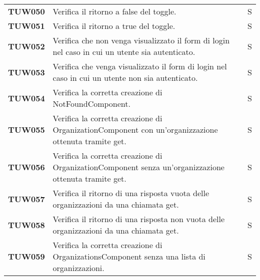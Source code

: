\documentclass[../../piano-di-qualifica.tex]{subfiles}
\begin{document}
\begin{longtable}[H]{>{\centering\bfseries}m{3cm} >{}m{10cm} >{\centering\arraybackslash}m{3cm}}
  TUW050             & Verifica il ritorno a false del toggle.                                                                             & S                             \\

  TUW051             & Verifica il ritorno a true del toggle.                                                                              & S                             \\

  TUW052             & Verifica che non venga visualizzato il form di login nel caso in cui un utente sia autenticato.                     & S                             \\

  TUW053             & Verifica che  venga visualizzato il form di login nel caso in cui un utente non sia autenticato.                    & S                             \\



  TUW054             & Verifica la corretta creazione di NotFoundComponent.                                                                & S                             \\



  TUW055             & Verifica la corretta creazione di OrganizationComponent con un'organizzazione ottenuta tramite get.                 & S                             \\
  TUW056             & Verifica la corretta creazione di OrganizationComponent senza un'organizzazione ottenuta tramite get.               & S                             \\
  TUW057             & Verifica il ritorno di una risposta vuota delle organizzazioni da una chiamata get.                                 & S                             \\
  TUW058             & Verifica il ritorno di una risposta non vuota delle organizzazioni da una chiamata get.                             & S                             \\


  TUW059             & Verifica la corretta creazione di OrganizationsComponent senza una lista di organizzazioni.                         & S                             \\


\end{longtable}
\end{document}
